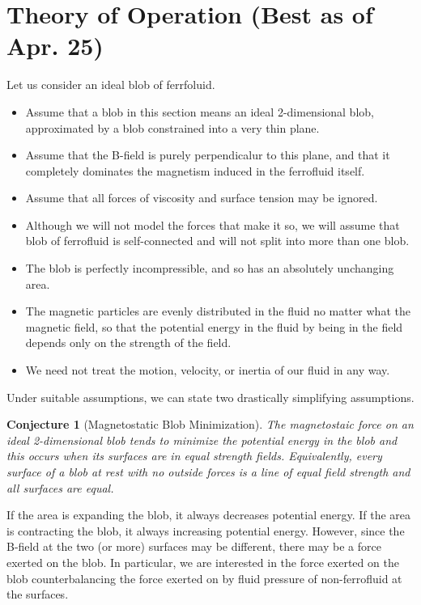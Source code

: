\documentclass[]{asme2ej}
\newtheorem{conjecture}{Conjecture}
\begin{document}
\section{Theory of Operation (Best as of Apr. 25)}

Let us consider an ideal blob of ferrfoluid.
\begin{itemize}
\item Assume that a blob in this section means an ideal 2-dimensional blob,
approximated by a blob constrained into a very thin plane.
\item Assume that the B-field is purely perpendicalur to this plane,
and that it completely dominates the magnetism induced in
the ferrofluid itself.
\item Assume that all forces of viscosity and surface tension may
  be ignored.
\item Although we will not model the forces that make it so,
  we will assume that blob of ferrofluid is self-connected and
  will not split into more than one blob.
\item The blob is perfectly incompressible, and so
  has an absolutely unchanging area.
\item The magnetic particles are evenly distributed in the
  fluid no matter what the magnetic field, so that the potential
  energy in the fluid by being in the field depends only on the
  strength of the field.
\item We need not treat the motion, velocity, or inertia of
  our fluid in any way.
\end{itemize}
Under suitable assumptions, we can state two drastically
simplifying assumptions.

\begin{conjecture}[Magnetostatic Blob Minimization]
  \label{conj:mbf}
  The magnetostaic force on an ideal 2-dimensional blob
  tends to minimize the potential energy in the blob
  and this occurs when its surfaces are in equal strength fields.
  Equivalently, every surface of a blob at rest with no outside
  forces is a line of equal field strength and all surfaces are equal.
\end{conjecture}


If the area is expanding the blob, it always decreases potential
energy. If the area is contracting the blob, it always increasing
potential energy. However, since the B-field at the two (or more)
surfaces may be different, there may be a force exerted on the
blob. In particular, we are interested in the force exerted on
the blob counterbalancing the force exerted on by fluid pressure
of non-ferrofluid at the surfaces.
\end{document}
